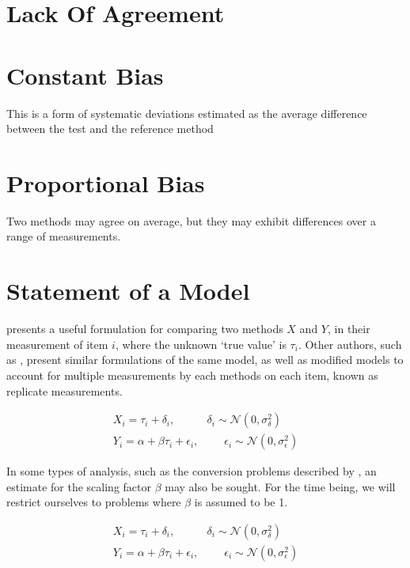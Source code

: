 \documentclass[12pt, a4paper]{report}
\theoremstyle{plain}
\theoremstyle{definition}
\theoremstyle{remark}
\begin{document}
	\section{Lack Of Agreement}
	
	
	\section*{Constant Bias} This is a form of systematic
	deviations estimated as the average difference between the test
	and the reference method
	
	
	\section*{Proportional Bias} Two methods may agree on
	average, but they may exhibit differences over a range of
	measurements.
	
	


	\section{Statement of a Model}
	\citet{BXC2010} presents a useful formulation for comparing two methods $X$ and $Y$, in their measurement of item $i$, where the unknown `true value' is $\tau_i$. Other authors, such as \citet{kinsella}, present similar formulations of the same model, as well as modified models to account for multiple measurements by each methods on each item, known as replicate measurements.
	
	\begin{eqnarray} X_i = \tau_i + \delta_i , \phantom{spacin} \delta_i \sim \mathcal{N}(0,\sigma^2_\delta)\\ Y_i = \alpha + \beta \tau_i + \epsilon_i, \phantom{spaci}  \epsilon_i \sim \mathcal{N}(0,\sigma^2_\epsilon)\end{eqnarray}
	
	In some types of analysis, such as the conversion problems described by \citet{lewis}, an estimate for 
	the scaling factor $\beta$ may also be sought. For the time being, we will restrict ourselves to problems where $\beta$ is assumed to be 1. 
	
	\begin{eqnarray}
		X_i = \tau_i + \delta_i , \phantom{spacin} \delta_i \sim \mathcal{N}(0,\sigma^2_\delta)\\
		Y_i = \alpha + \beta \tau_i + \epsilon_i, \phantom{spaci}  \epsilon_i \sim \mathcal{N}(0,\sigma^2_\epsilon)
	\end{eqnarray}
	
\end{document}
